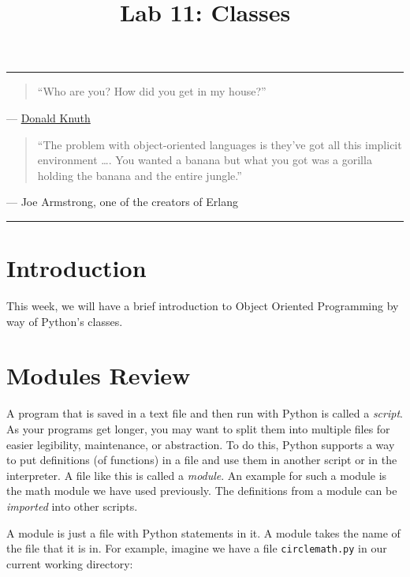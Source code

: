 \documentclass[11pt]{cselabheader}
\title{Lab 11: Classes}
\begin{document}
\maketitle
{}
\hrule

\begin{quotation}
``Who are you? How did you get in my house?''
\end{quotation}
\begin{flushright}
  --- \href{https://xkcd.com/163/}{Donald Knuth}
\end{flushright}

\begin{quotation}
``The problem with object-oriented languages is they've got all this implicit environment \dots . You wanted a banana but what you got was a gorilla holding the banana and the entire jungle.''
\end{quotation}
\begin{flushright}
  ---  Joe Armstrong, one of the creators of Erlang
\end{flushright}

\hrule

\section{Introduction}
This week, we will have a brief introduction to Object Oriented Programming by
way of Python's classes.

\tableofcontents
\pagebreak
{}

\section{Modules Review}
\label{sec:modules}

A program that is saved in a text file and then run with Python is called a
\emph{script}. As your programs get longer, you may want to split them into
multiple files for easier legibility, maintenance, or abstraction. To do this,
Python supports a way to put definitions (of functions) in a file and use them
in another script or in the interpreter. A file like this is called a
\emph{module}. An example for such a module is the math module we have used
previously. The definitions from a module can be \emph{imported} into other
scripts.

A module is just a file with Python statements in it. A module takes the name of
the file that it is in. For example, imagine we have a file
\texttt{circlemath.py} in our current working directory:
\end{document}
